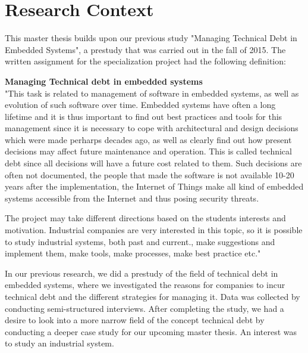 







\section{Research Context}
This master thesis builds upon our previous study "Managing Technical Debt in Embedded Systems"\cite{forprosjekt}, a prestudy that was carried out in the fall of 2015. The written assignment for the specialization project had the following definition:

\begin{addmargin}[2em]{2em}
\textbf{Managing Technical debt in embedded systems} \\
"This task is related to management of software in embedded systems, as well as evolution of such software over time. Embedded systems have often a long lifetime and it is thus important to find out best practices and tools for this management since it is necessary to cope with architectural and design decisions which were made perharps decades ago, as well as clearly find out how present decisions may affect future maintenance and operation. This is called technical debt since all decisions will have a future cost related to them. Such decisions are often not documented, the people that made the software is not available 10-20 years after the implementation, the Internet of Things make all kind of embedded systems accessible from the Internet and thus posing security threats.

The project may take different directions based on the students interests and motivation. Industrial companies are very interested in this topic, so it is possible to study industrial systems, both past and current., make suggestions and implement them, make tools, make processes, make best practice etc."
\end{addmargin}

In our previous research, we did a prestudy of the field of technical debt in embedded systems, where we investigated the reasons for companies to incur technical debt and the different strategies for managing it. Data was collected by conducting semi-structured interviews. After completing the study, we had a desire to look into a more narrow field of the concept technical debt by conducting a deeper case study for our upcoming master thesis. An interest was to study an industrial system.

